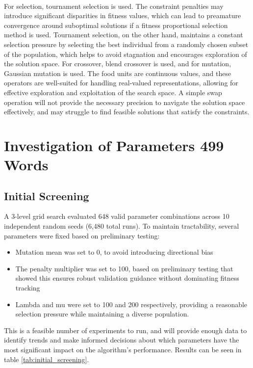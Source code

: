 \documentclass[11pt]{article}
\begin{document}
\paragraph{}
For selection, tournament selection is used. The constraint penalties may introduce significant disparities in fitness values, which can lead to preamature convergence around suboptimal solutions if a fitness proportional selection method is used. Tournament selection, on the other hand, maintains a constant selection pressure by selecting the best individual from a randomly chosen subset of the population, which helps to avoid stagnation and encourages exploration of the solution space. For crossover, blend crossover is used, and for mutation, Gaussian mutation is used. The food units are continuous values, and these operators are well-suited for handling real-valued representations, allowing for effective exploration and exploitation of the search space. A simple swap operation will not provide the necessary precision to navigate the solution space effectively, and may struggle to find feasible solutions that satisfy the constraints.  

\newpage
\section{Investigation of Parameters 499 Words}

\subsection{Initial Screening} 
A 3-level grid search evaluated 648 valid parameter combinations across 10 independent random seeds (6,480 total runs). To maintain tractability, several parameters were fixed based on preliminary testing:
\begin{itemize}
    \item Mutation mean was set to 0, to avoid introducing directional bias
    \item The penalty multiplier was set to 100, based on preliminary testing that showed this ensures robust validation guidance without dominating fitness tracking
    \item Lambda and mu were set to 100 and 200 respectively, providing a reasonable selection pressure while maintaining a diverse population.
\end{itemize}
This is a feasible number of experiments to run, and will provide enough data to identify trends and make informed decisions about which parameters have the most significant impact on the algorithm's performance. Results can be seen in table \ref{tab:initial_screening}. 
\end{document}
